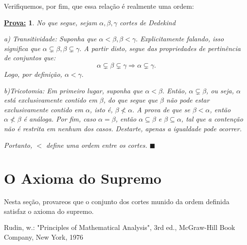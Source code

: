 \documentclass{article}
\newtheorem*{proof*}{\underline{Prova:}}
\renewcommand\qedsymbol{$\blacksquare$}
\begin{document}
Verifiquemos, por fim, que essa rela\c c\~ao \'e realmente uma ordem:
\begin{proof*} No que segue, sejam $\alpha, \beta, \gamma$ cortes de Dedekind

a) Transitividade: Suponha que $\alpha < \beta, \beta < \gamma.$ Explicitamente falando, isso significa que $\alpha\subsetneq\beta, \beta\subsetneq\gamma.$ A partir disto, segue das propriedades de pertin\^encia de conjuntos que:
$$
	\alpha\subsetneq\beta\subsetneq\gamma \Rightarrow \alpha\subsetneq\gamma.
$$
Logo, por defini\c c\~ao, $\alpha < \gamma.$

b)Tricotomia: Em primeiro lugar, suponha que $\alpha < \beta.$ Ent\~ao, $\alpha\subsetneq\beta$, ou seja, $\alpha$ est\'a exclusivamente contido em $\beta$, do que segue que $\beta$ n\~ao pode estar exclusivamente contido em $\alpha$, isto \'e, $\beta \nless \alpha.$ A prova de que se $\beta < \alpha$, ent\~ao $\alpha \nless \beta$ \'e an\'aloga. Por fim, caso $\alpha = \beta$, ent\~ao $\alpha\subseteq\beta$ e $\beta\subseteq\alpha$, tal que a conten\c c\~ao n\~ao \'e restrita em nenhum dos casos. Destarte, apenas a igualdade pode ocorrer.

Portanto, $<$ define uma ordem entre os cortes.
\qedsymbol
\end{proof*}

\section{O Axioma do Supremo}
Nesta se\c c\~ao, provareos que o conjunto dos cortes munido da ordem definida satisfaz o axioma do supremo.

\begin{thebibliography}{9}
Rudin, w.: "Principles of Mathematical Analysis", 3rd ed., McGraw-Hill Book Company, New York, 1976
\end{thebibliography}
\end{document}
